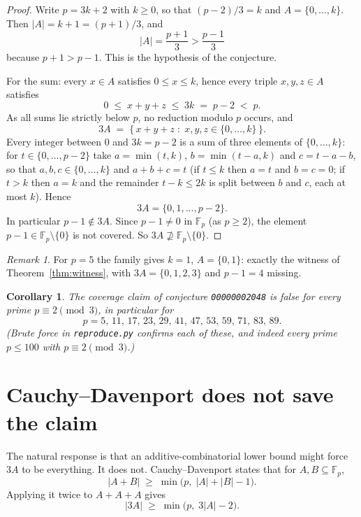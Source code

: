 \documentclass[11pt]{article}
\newtheorem{corollary}[theorem]{Corollary}
\theoremstyle{definition}
\theoremstyle{remark}
\newtheorem{remark}[theorem]{Remark}
\newcommand{\F}{\mathbb{F}}
\begin{document}
\begin{proof}
Write $p = 3k + 2$ with $k \ge 0$, so that $(p-2)/3 = k$ and $A = \{0, \dots,
k\}$. Then $|A| = k+1 = (p+1)/3$, and
\[
|A| = \frac{p+1}{3} > \frac{p-1}{3}
\]
because $p+1 > p-1$. This is the hypothesis of the conjecture.

For the sum: every $x \in A$ satisfies $0 \le x \le k$, hence every triple
$x,y,z \in A$ satisfies
\[
0 \;\le\; x + y + z \;\le\; 3k \;=\; p - 2 \;<\; p .
\]
As all sums lie strictly below $p$, no reduction modulo $p$ occurs, and
\[
3A \;=\; \{\,x+y+z \;:\; x,y,z \in \{0,\dots,k\}\,\}.
\]
Every integer between $0$ and $3k = p-2$ is a sum of three elements of
$\{0,\dots,k\}$: for $t \in \{0,\dots,p-2\}$ take
$a = \min(t, k)$, $b = \min(t-a, k)$ and $c = t-a-b$, so that $a,b,c \in
\{0,\dots,k\}$ and $a+b+c = t$ (if $t \le k$ then $a = t$ and $b = c = 0$; if
$t > k$ then $a = k$ and the remainder $t - k \le 2k$ is split between $b$ and
$c$, each at most $k$). Hence
\[
3A = \{0, 1, \dots, p-2\}.
\]
In particular $p-1 \notin 3A$. Since $p-1 \ne 0$ in $\F_p$ (as $p \ge 2$), the
element $p-1 \in \F_p \setminus \{0\}$ is not covered. So $3A \not\supseteq
\F_p \setminus \{0\}$.
\end{proof}

\begin{remark}
For $p = 5$ the family gives $k = 1$, $A = \{0,1\}$: exactly the witness of
Theorem~\ref{thm:witness}, with $3A = \{0,1,2,3\}$ and $p-1 = 4$ missing.
\end{remark}

\begin{corollary}
The coverage claim of conjecture \texttt{00000002048} is false for every prime
$p \equiv 2 \pmod 3$, in particular for
\[
p = 5,\, 11,\, 17,\, 23,\, 29,\, 41,\, 47,\, 53,\, 59,\, 71,\, 83,\, 89.
\]
(Brute force in \texttt{reproduce.py} confirms each of these, and indeed every
prime $p \le 100$ with $p \equiv 2 \pmod 3$.)
\end{corollary}

\section{Cauchy--Davenport does not save the claim}

The natural response is that an additive-combinatorial lower bound might force
$3A$ to be everything. It does not. Cauchy--Davenport states that for
$A, B \subseteq \F_p$,
\[
|A + B| \;\ge\; \min\bigl(p,\; |A| + |B| - 1\bigr).
\]
Applying it twice to $A + A + A$ gives
\[
|3A| \;\ge\; \min\bigl(p,\; 3|A| - 2\bigr).
\]
\end{document}
